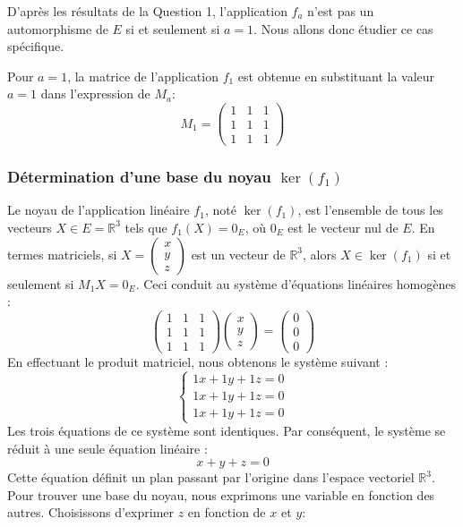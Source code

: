 \documentclass{report}
\begin{document}
D'après les résultats de la Question 1, l'application $f_a$ n'est pas un automorphisme de $E$ si et seulement si $a=1$. Nous allons donc étudier ce cas spécifique.

Pour $a=1$, la matrice de l'application $f_1$ est obtenue en substituant la valeur $a=1$ dans l'expression de $M_a$:
$$M_1 = \begin{pmatrix} 1 & 1 & 1 \\ 1 & 1 & 1 \\ 1 & 1 & 1 \end{pmatrix}$$

\subsubsection*{Détermination d'une base du noyau $\ker(f_1)$}

Le noyau de l'application linéaire $f_1$, noté $\ker(f_1)$, est l'ensemble de tous les vecteurs $X \in E = \mathbb{R}^3$ tels que $f_1(X) = 0_E$, où $0_E$ est le vecteur nul de $E$.
En termes matriciels, si $X = \begin{pmatrix} x \\ y \\ z \end{pmatrix}$ est un vecteur de $\mathbb{R}^3$, alors $X \in \ker(f_1)$ si et seulement si $M_1 X = 0_E$.
Ceci conduit au système d'équations linéaires homogènes :
$$ \begin{pmatrix} 1 & 1 & 1 \\ 1 & 1 & 1 \\ 1 & 1 & 1 \end{pmatrix} \begin{pmatrix} x \\ y \\ z \end{pmatrix} = \begin{pmatrix} 0 \\ 0 \\ 0 \end{pmatrix} $$
En effectuant le produit matriciel, nous obtenons le système suivant :
$$ \begin{cases} 1x + 1y + 1z = 0 \\ 1x + 1y + 1z = 0 \\ 1x + 1y + 1z = 0 \end{cases} $$
Les trois équations de ce système sont identiques. Par conséquent, le système se réduit à une seule équation linéaire :
$$ x + y + z = 0 $$
Cette équation définit un plan passant par l'origine dans l'espace vectoriel $\mathbb{R}^3$. Pour trouver une base du noyau, nous exprimons une variable en fonction des autres. Choisissons d'exprimer $z$ en fonction de $x$ et $y$:
\end{document}
